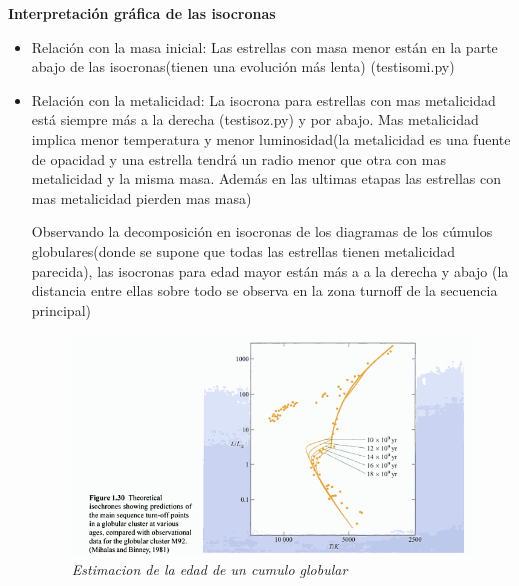 \documentclass[10pt]{book}
\begin{document}
\textbf{Interpretación gráfica de las isocronas}
\begin{itemize}
\item Relación con la masa inicial: Las estrellas con masa menor están en la parte abajo de las isocronas(tienen una evolución más lenta) (testisomi.py)
\item Relación con la metalicidad: La isocrona para estrellas con mas metalicidad está siempre más a la derecha (testisoz.py)
y por abajo.
Mas metalicidad implica menor temperatura y menor luminosidad(la metalicidad es una fuente de opacidad y  una estrella tendrá un radio menor que otra con mas metalicidad y la misma masa. Además en las ultimas etapas las estrellas con mas metalicidad pierden mas masa)
\par Observando la decomposición en isocronas de los diagramas de los cúmulos globulares(donde se supone que todas las estrellas tienen metalicidad parecida), las isocronas para edad mayor están más a a la derecha y abajo (la distancia entre ellas sobre todo se observa en la zona turnoff de la secuencia principal)

\begin{figure}[!h]
 \centering
 \includegraphics[scale=0.7]{gciso.png}
 \caption{\emph{Estimacion de la edad de un cumulo globular}}
 \label{Fig: 2}
\end{figure}
\end{itemize}
\end{document}
